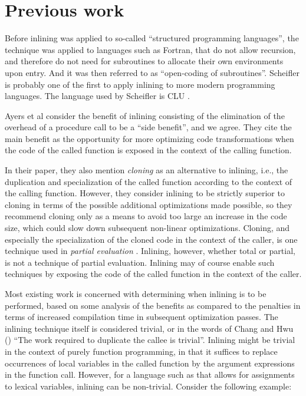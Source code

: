 \section{Previous work}

Before inlining was applied to so-called ``structured programming
languages'', the technique was applied to languages such as Fortran,
that do not allow recursion, and therefore do not need for subroutines
to allocate their own environments upon entry.  And it was then
referred to as ``open-coding of subroutines''.  Scheifler
\cite{Scheifler:1977:AIS:359810.359830} is probably one of the first
to apply inlining to more modern programming languages.  The language
used by Scheifler is CLU \cite{Liskov:1977:AMC:359763.359789}.

Ayers et al \cite{Ayers:1997:AI:258915.258928} consider the benefit of
inlining consisting of the elimination of the overhead of a procedure
call to be a ``side benefit'', and we agree.  They cite the main
benefit as the opportunity for more optimizing code transformations
when the code of the called function is exposed in the context of the
calling function.

In their paper, they also mention \emph{cloning} as an alternative to
inlining, i.e., the duplication and specialization of the called
function according to the context of the calling function.  However,
they consider inlining to be strictly superior to cloning in terms of
the possible additional optimizations made possible, so they recommend
cloning only as a means to avoid too large an increase in the code
size, which could slow down subsequent non-linear optimizations.
Cloning, and especially the specialization of the cloned code in the
context of the caller, is one technique used in \emph{partial
  evaluation} \cite{Jones:1993:PEA:153676}.  Inlining, however,
whether total or partial, is not a technique of partial evaluation.
Inlining may of course enable such techniques by exposing the code of
the called function in the context of the caller.

Most existing work is concerned with determining when inlining is to
be performed, based on some analysis of the benefits as compared to
the penalties in terms of increased compilation time in subsequent
optimization passes.  The inlining technique itself is considered
trivial, or in the words of Chang and Hwu
(\cite{Chang:1989:IFE:73141.74840, Chang:1989:IFE:74818.74840}) ``The
work required to duplicate the callee is trivial''.  Inlining might be
trivial in the context of purely function programming, in that it
suffices to replace occurrences of local variables in the called
function by the argument expressions in the function call.  However,
for a language such as \commonlisp{} that allows for assignments to
lexical variables, inlining can be non-trivial.  Consider the
following example:

